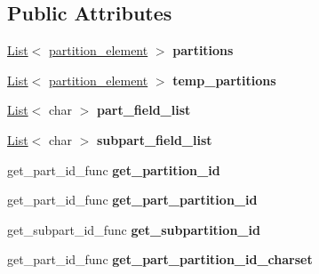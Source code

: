 \subsection*{Public Attributes}
\begin{DoxyCompactItemize}
\item 
\mbox{\label{classpartition__info_ae84fb3ae14a78d70a0580bfdde1956c5}} 
\mbox{\hyperlink{classList}{List}}$<$ \mbox{\hyperlink{classpartition__element}{partition\+\_\+element}} $>$ {\bfseries partitions}
\item 
\mbox{\label{classpartition__info_a63fb2b9b04362cf03667c6d0da19a127}} 
\mbox{\hyperlink{classList}{List}}$<$ \mbox{\hyperlink{classpartition__element}{partition\+\_\+element}} $>$ {\bfseries temp\+\_\+partitions}
\item 
\mbox{\label{classpartition__info_a6031d3e8f2527080af1f00147e05885c}} 
\mbox{\hyperlink{classList}{List}}$<$ char $>$ {\bfseries part\+\_\+field\+\_\+list}
\item 
\mbox{\label{classpartition__info_ab5e810fde7393164e35d81326dc6119d}} 
\mbox{\hyperlink{classList}{List}}$<$ char $>$ {\bfseries subpart\+\_\+field\+\_\+list}
\item 
\mbox{\label{classpartition__info_ae1a566a488e515fab953dd018d60d37c}} 
get\+\_\+part\+\_\+id\+\_\+func {\bfseries get\+\_\+partition\+\_\+id}
\item 
\mbox{\label{classpartition__info_a32fbe9ff487c6f966fb6cd0e0610fd43}} 
get\+\_\+part\+\_\+id\+\_\+func {\bfseries get\+\_\+part\+\_\+partition\+\_\+id}
\item 
\mbox{\label{classpartition__info_ac846fba155618d638e4fff26640b3b8a}} 
get\+\_\+subpart\+\_\+id\+\_\+func {\bfseries get\+\_\+subpartition\+\_\+id}
\item 
\mbox{\label{classpartition__info_a48240df94db759fcf91ac6aa4bf31a23}} 
get\+\_\+part\+\_\+id\+\_\+func {\bfseries get\+\_\+part\+\_\+partition\+\_\+id\+\_\+charset}
\item 
\mbox{\label{classpartition__info_aab0f11850f6615b7859fb88cbc1e0439}} 

\end{DoxyCompactItemize}

